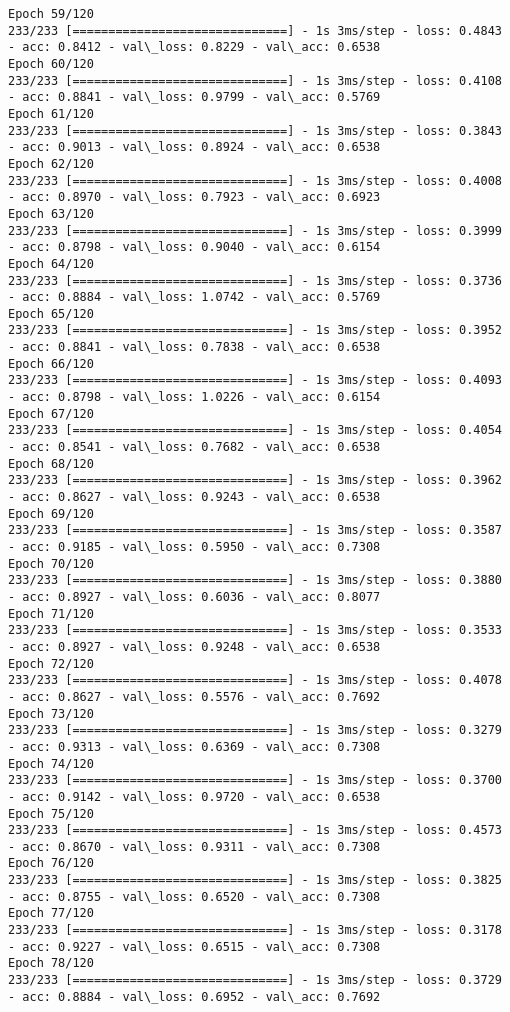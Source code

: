 \documentclass[11pt]{article}
\begin{document}
\begin{Verbatim}[commandchars=\\\{\}]
Epoch 59/120
233/233 [==============================] - 1s 3ms/step - loss: 0.4843 - acc: 0.8412 - val\_loss: 0.8229 - val\_acc: 0.6538
Epoch 60/120
233/233 [==============================] - 1s 3ms/step - loss: 0.4108 - acc: 0.8841 - val\_loss: 0.9799 - val\_acc: 0.5769
Epoch 61/120
233/233 [==============================] - 1s 3ms/step - loss: 0.3843 - acc: 0.9013 - val\_loss: 0.8924 - val\_acc: 0.6538
Epoch 62/120
233/233 [==============================] - 1s 3ms/step - loss: 0.4008 - acc: 0.8970 - val\_loss: 0.7923 - val\_acc: 0.6923
Epoch 63/120
233/233 [==============================] - 1s 3ms/step - loss: 0.3999 - acc: 0.8798 - val\_loss: 0.9040 - val\_acc: 0.6154
Epoch 64/120
233/233 [==============================] - 1s 3ms/step - loss: 0.3736 - acc: 0.8884 - val\_loss: 1.0742 - val\_acc: 0.5769
Epoch 65/120
233/233 [==============================] - 1s 3ms/step - loss: 0.3952 - acc: 0.8841 - val\_loss: 0.7838 - val\_acc: 0.6538
Epoch 66/120
233/233 [==============================] - 1s 3ms/step - loss: 0.4093 - acc: 0.8798 - val\_loss: 1.0226 - val\_acc: 0.6154
Epoch 67/120
233/233 [==============================] - 1s 3ms/step - loss: 0.4054 - acc: 0.8541 - val\_loss: 0.7682 - val\_acc: 0.6538
Epoch 68/120
233/233 [==============================] - 1s 3ms/step - loss: 0.3962 - acc: 0.8627 - val\_loss: 0.9243 - val\_acc: 0.6538
Epoch 69/120
233/233 [==============================] - 1s 3ms/step - loss: 0.3587 - acc: 0.9185 - val\_loss: 0.5950 - val\_acc: 0.7308
Epoch 70/120
233/233 [==============================] - 1s 3ms/step - loss: 0.3880 - acc: 0.8927 - val\_loss: 0.6036 - val\_acc: 0.8077
Epoch 71/120
233/233 [==============================] - 1s 3ms/step - loss: 0.3533 - acc: 0.8927 - val\_loss: 0.9248 - val\_acc: 0.6538
Epoch 72/120
233/233 [==============================] - 1s 3ms/step - loss: 0.4078 - acc: 0.8627 - val\_loss: 0.5576 - val\_acc: 0.7692
Epoch 73/120
233/233 [==============================] - 1s 3ms/step - loss: 0.3279 - acc: 0.9313 - val\_loss: 0.6369 - val\_acc: 0.7308
Epoch 74/120
233/233 [==============================] - 1s 3ms/step - loss: 0.3700 - acc: 0.9142 - val\_loss: 0.9720 - val\_acc: 0.6538
Epoch 75/120
233/233 [==============================] - 1s 3ms/step - loss: 0.4573 - acc: 0.8670 - val\_loss: 0.9311 - val\_acc: 0.7308
Epoch 76/120
233/233 [==============================] - 1s 3ms/step - loss: 0.3825 - acc: 0.8755 - val\_loss: 0.6520 - val\_acc: 0.7308
Epoch 77/120
233/233 [==============================] - 1s 3ms/step - loss: 0.3178 - acc: 0.9227 - val\_loss: 0.6515 - val\_acc: 0.7308
Epoch 78/120
233/233 [==============================] - 1s 3ms/step - loss: 0.3729 - acc: 0.8884 - val\_loss: 0.6952 - val\_acc: 0.7692

\end{Verbatim}
\end{document}
